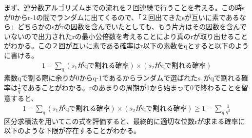 \documentclass[a4paper,10.5pt]{article}
\numberwithin{equation}{section}
\begin{document}
 まず、連分数アルゴリズムまでの流れを２回連続で行うことを考える。この時sが0からr-1の間でランダムに出てくるので、「２回出てきたsが互いに素であるなら」どちらかのsがrの因数を含んでいたとしても、もう片方はその因数を含んでいないので出力されたrの最小公倍数を考えることにより真のrが取り出せることがわかる。この２回が互いに素である確率はr以下の素数をqとすると以下のように書ける。
\begin{equation}\begin{split}
    1-\sum_{q}(\text{$s_{1}$がqで割れる確率})\times (\text{$s_{2}$がqで割れる確率})
\end{split} \end{equation}
素数qで割る際に余りが0からq-1であるからランダムで選ばれた$s_{1}$がqで割れる確率は$\frac{1}{q}$であることがわかる。rのあまりの周期が1から始まって0で終わることを留意すると、
\begin{equation}\begin{split}
    1 - \sum_{q} (\text{$s_{1}$がqで割れる確率}) \times (\text{$s_{2}$がqで割れる確率})
    \geq 1 - \sum_{q} \frac{1}{q^{2}}
\end{split} \end{equation}
区分求積法を用いてこの式を評価すると、最終的に適切な位数rが求まる確率に以下のような下限が存在することがわかる。
\end{document}
